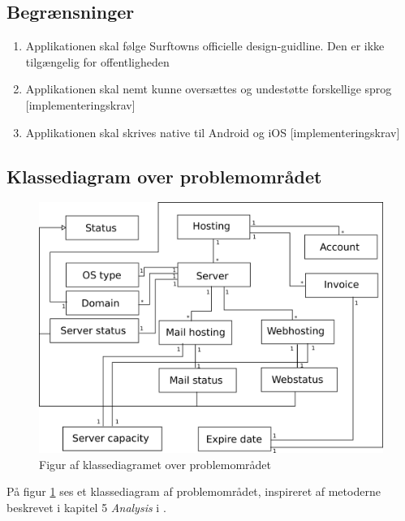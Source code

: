 \documentclass[12pt]{article}
\begin{document}
\subsection*{Begrænsninger}
\label{constrains}
\begin{enumerate}
  \item{Applikationen skal følge Surftowns officielle design-guidline. Den er ikke tilgængelig for offentligheden}
  \item{Applikationen skal nemt kunne oversættes og undestøtte forskellige sprog [implementeringskrav]}
  \item{Applikationen skal skrives native til Android og iOS [implementeringskrav]}
\end{enumerate}

\subsection*{Klassediagram over problemområdet}
\label{class_diagram_section}
\begin{figure}[h]
	\centering
	\includegraphics[width=13cm]{class_diagram_v2.png}
	\caption{Figur af klassediagramet over problemområdet}
	\label{classdiagram}
\end{figure}
På figur \ref{classdiagram} ses et klassediagram af problemområdet, inspireret af metoderne beskrevet i kapitel 5 \emph{Analysis} i \cite{OOSE}. 
\end{document}
